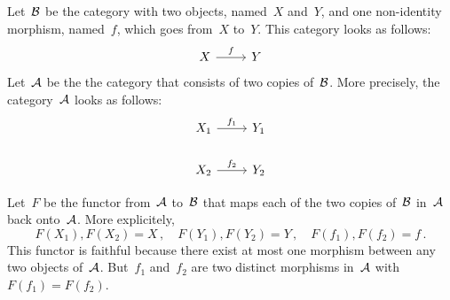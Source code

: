 \subsubsection{}

Let~$\mathcal{B}$ be the category with two objects, named~$X$ and~$Y$, and one non-identity morphism, named~$f$, which goes from~$X$ to~$Y$.
This category looks as follows:
\[
	\begin{tikzcd}
		X
		\arrow{r}[above]{f}
		&
		Y
	\end{tikzcd}
\]
Let~$\mathcal{A}$ be the the category that consists of two copies of~$\mathcal{B}$.
More precisely, the category~$\mathcal{A}$ looks as follows:
\[
	\begin{tikzcd}
		X_1
		\arrow{r}[above]{f_1}
		&
		Y_1
		\\
		X_2
		\arrow{r}[above]{f_2}
		&
		Y_2
	\end{tikzcd}
\]

Let~$F$ be the functor from~$\mathcal{A}$ to~$\mathcal{B}$ that maps each of the two copies of~$\mathcal{B}$ in~$\mathcal{A}$ back onto~$\mathcal{A}$.
More explicitely,
\[
	F(X_1), F(X_2) = X \,,
	\quad
	F(Y_1), F(Y_2) = Y \,,
	\quad
	F(f_1), F(f_2) = f \,.
\]
This functor is faithful because there exist at most one morphism between any two objects of~$\mathcal{A}$.
But~$f_1$ and~$f_2$ are two distinct morphisms in~$\mathcal{A}$ with~$F(f_1) = F(f_2)$.
